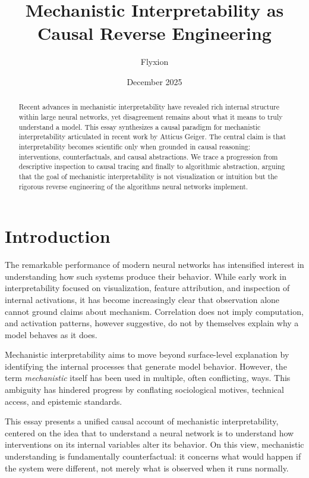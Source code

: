 \documentclass[11pt]{article}
\title{Mechanistic Interpretability as Causal Reverse Engineering}
\author{Flyxion}
\date{December 2025}
\begin{document}
\maketitle

\begin{abstract}

Recent advances in mechanistic interpretability have revealed rich internal
structure within large neural networks, yet disagreement remains about what it
means to truly understand a model. This essay synthesizes a causal paradigm for
mechanistic interpretability articulated in recent work by Atticus Geiger. The
central claim is that interpretability becomes scientific only when grounded in
causal reasoning: interventions, counterfactuals, and causal abstractions. We
trace a progression from descriptive inspection to causal tracing and finally to
algorithmic abstraction, arguing that the goal of mechanistic interpretability is
not visualization or intuition but the rigorous reverse engineering of the
algorithms neural networks implement.

\end{abstract}

\section{Introduction}

The remarkable performance of modern neural networks has intensified interest
in understanding how such systems produce their behavior. While early work in
interpretability focused on visualization, feature attribution, and inspection
of internal activations, it has become increasingly clear that observation alone
cannot ground claims about mechanism. Correlation does not imply computation,
and activation patterns, however suggestive, do not by themselves explain why a
model behaves as it does.

Mechanistic interpretability aims to move beyond surface-level explanation by
identifying the internal processes that generate model behavior. However, the
term \emph{mechanistic} itself has been used in multiple, often conflicting,
ways. This ambiguity has hindered progress by conflating sociological motives,
technical access, and epistemic standards.

This essay presents a unified causal account of mechanistic interpretability,
centered on the idea that to understand a neural network is to understand how
interventions on its internal variables alter its behavior. On this view,
mechanistic understanding is fundamentally counterfactual: it concerns what
would happen if the system were different, not merely what is observed when it
runs normally.
\end{document}
